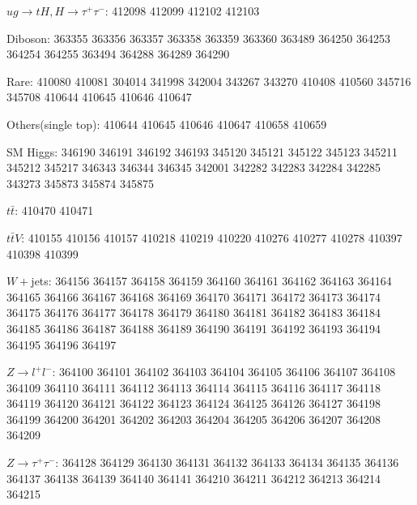 $ug\to tH, H\to\tau^+\tau^-$: 412098 412099 412102 412103

Diboson: 363355 363356 363357 363358 363359 363360 363489 364250 364253 364254 364255 363494 364288 364289 364290

Rare: 410080 410081 304014 341998 342004 343267 343270 410408 410560 345716 345708 410644 410645 410646 410647

Others(single top): 410644 410645 410646 410647 410658 410659

SM Higgs: 346190 346191 346192 346193 345120 345121 345122 345123 345211 345212 345217 346343 346344 346345 342001 342282 342283 342284 342285 343273 345873 345874 345875

$t\bar{t}$: 410470 410471

$t\bar{t}V$: 410155 410156 410157 410218 410219 410220 410276 410277 410278 410397 410398 410399

$W+$jets: 364156 364157 364158 364159 364160 364161 364162 364163 364164 364165 364166 364167 364168 364169 364170 364171 364172 364173 364174 364175 364176 364177 364178 364179 364180 364181 364182 364183 364184 364185 364186 364187 364188 364189 364190 364191 364192 364193 364194 364195 364196
364197

$Z\to l^+l^-$: 364100 364101 364102 364103 364104 364105 364106 364107 364108 364109 364110 364111 364112 364113 364114 364115 364116 364117 364118 364119 364120 364121 364122 364123 364124 364125 364126 364127 364198 364199 364200 364201 364202 364203 364204 364205 364206 364207 364208 364209

$Z\to\tau^+\tau^-$: 364128 364129 364130 364131 364132 364133 364134 364135 364136 364137 364138 364139 364140 364141 364210 364211 364212 364213 364214 364215
